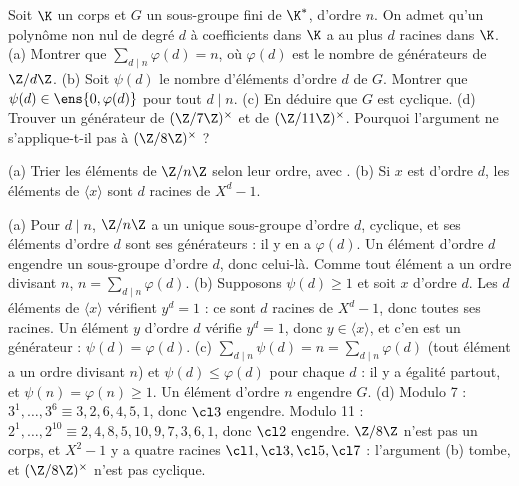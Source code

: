 \begin{exo}
Soit $\K$ un corps et $G$ un sous-groupe fini de $\K^*$, d'ordre $n$. On admet qu'un polynôme non nul de degré $d$ à coefficients dans $\K$ a au plus $d$ racines dans $\K$. (a) Montrer que $\sum_{d\mid n}\varphi(d)=n$, où $\varphi(d)$ est le nombre de générateurs de $\Z/d\Z$. (b) Soit $\psi(d)$ le nombre d'éléments d'ordre $d$ de $G$. Montrer que $\psi(d)\in\ens{0,\varphi(d)}$ pour tout $d\mid n$. (c) En déduire que $G$ est cyclique. (d) Trouver un générateur de $(\Z/7\Z)^\times$ et de $(\Z/11\Z)^\times$. Pourquoi l'argument ne s'applique-t-il pas à $(\Z/8\Z)^\times$ ?
\begin{indication}
(a) Trier les éléments de $\Z/n\Z$ selon leur ordre, avec . (b) Si $x$ est d'ordre $d$, les éléments de $\langle x\rangle$ sont $d$ racines de $X^d-1$.
\end{indication}
\begin{corrige}
(a) Pour $d\mid n$, $\Z/n\Z$ a un unique sous-groupe d'ordre $d$, cyclique, et ses éléments d'ordre $d$ sont ses générateurs : il y en a $\varphi(d)$. Un élément d'ordre $d$ engendre un sous-groupe d'ordre $d$, donc celui-là. Comme tout élément a un ordre divisant $n$, $n=\sum_{d\mid n}\varphi(d)$.
(b) Supposons $\psi(d)\ge1$ et soit $x$ d'ordre $d$. Les $d$ éléments de $\langle x\rangle$ vérifient $y^d=1$ : ce sont $d$ racines de $X^d-1$, donc toutes ses racines. Un élément $y$ d'ordre $d$ vérifie $y^d=1$, donc $y\in\langle x\rangle$, et c'en est un générateur : $\psi(d)=\varphi(d)$.
(c) $\sum_{d\mid n}\psi(d)=n=\sum_{d\mid n}\varphi(d)$ (tout élément a un ordre divisant $n$) et $\psi(d)\le\varphi(d)$ pour chaque $d$ : il y a égalité partout, et $\psi(n)=\varphi(n)\ge1$. Un élément d'ordre $n$ engendre $G$.
(d) Modulo 7 : $3^1,\dots,3^6\equiv3,2,6,4,5,1$, donc $\cl3$ engendre. Modulo 11 : $2^1,\dots,2^{10}\equiv2,4,8,5,10,9,7,3,6,1$, donc $\cl2$ engendre. $\Z/8\Z$ n'est pas un corps, et $X^2-1$ y a quatre racines $\cl1,\cl3,\cl5,\cl7$ : l'argument (b) tombe, et $(\Z/8\Z)^\times$ n'est pas cyclique.
\end{corrige}
\end{exo}

